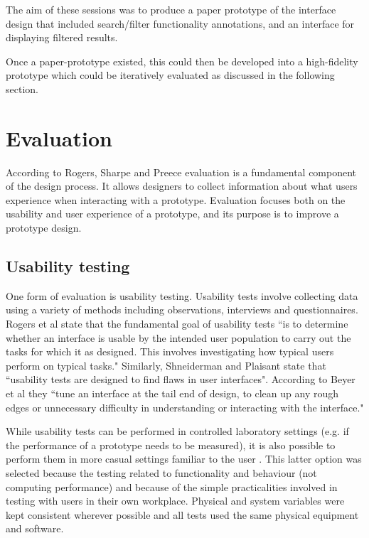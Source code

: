 The aim of these sessions was to produce a paper prototype of the interface design that included search/filter functionality annotations, and an interface for displaying filtered results. 

Once a paper-prototype existed, this could then be developed into a high-fidelity prototype which could be iteratively evaluated as discussed in the following section. 

\section{Evaluation}
According to Rogers, Sharpe and Preece \citep[p. 433]{RogersPreece} evaluation is a fundamental component of the design process. It allows designers to collect information about what users experience when interacting with a prototype. Evaluation focuses both on the usability and user experience of a prototype, and its purpose is to improve a prototype design.
\subsection{Usability testing}
One form of evaluation is usability testing. Usability tests involve collecting data using a variety of methods including observations, interviews and questionnaires. Rogers et al \citep[p. 438]{RogersPreece}  state that the fundamental goal of usability tests ``is to determine whether an interface is usable by the intended user population to carry out the tasks for which it as designed. This involves investigating how typical users perform on typical tasks." Similarly, Shneiderman and Plaisant \citep[p. 144]{ShneidermanPlaisant} state that ``usability tests are designed to find flaws in user interfaces". According to Beyer et al \citep[p. 373]{BeyerHoltzblatt} they ``tune an interface at the tail end of design, to clean up any rough edges or unnecessary difficulty in understanding or interacting with the interface."

While usability tests can be performed in controlled laboratory settings (e.g. if the performance of a prototype needs to be measured), it is also possible to perform them in more casual settings familiar to the user \citep[p. 438]{RogersPreece}. This latter option was selected because the testing related to functionality and behaviour (not computing performance) and because of the simple practicalities involved in testing with users in their own workplace. Physical and system variables were kept consistent wherever possible and all tests used the same physical equipment and software. 

